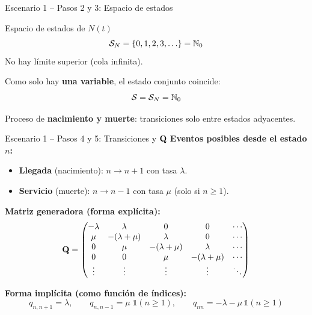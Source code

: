 \documentclass[aspectratio=1610, 9pt]{beamer}
\begin{document}
\begin{frame}{Escenario 1 -- Pasos 2 y 3: Espacio de estados}
\begin{block}{Espacio de estados de $N(t)$}
\[
\mathcal{S}_N = \{0, 1, 2, 3, \ldots\} = \mathbb{N}_0
\]
No hay l\'imite superior (cola infinita).
\end{block}

\vspace{4pt}
Como solo hay \textbf{una variable}, el estado conjunto coincide:
\[
\mathcal{S} = \mathcal{S}_N = \mathbb{N}_0
\]

\vspace{4pt}
\centering
{}

\vspace{4pt}
\small Proceso de \textbf{nacimiento y muerte}: transiciones solo entre estados adyacentes.
\end{frame}

\begin{frame}{Escenario 1 -- Pasos 4 y 5: Transiciones y $\mathbf{Q}$}
\textbf{Eventos posibles desde el estado $n$:}
\begin{itemize}
    \item \textbf{Llegada} (nacimiento): $n \to n+1$ con tasa $\lambda$.
    \item \textbf{Servicio} (muerte): $n \to n-1$ con tasa $\mu$ (solo si $n \ge 1$).
\end{itemize}

\vspace{4pt}
\textbf{Matriz generadora (forma expl\'icita):}
\[
\mathbf{Q} = \begin{pmatrix}
-\lambda & \lambda & 0 & 0 & \cdots \\
\mu & -(\lambda+\mu) & \lambda & 0 & \cdots \\
0 & \mu & -(\lambda+\mu) & \lambda & \cdots \\
0 & 0 & \mu & -(\lambda+\mu) & \cdots \\
\vdots & \vdots & \vdots & \vdots & \ddots
\end{pmatrix}
\]

\vspace{4pt}
\textbf{Forma impl\'icita (como funci\'on de \'indices):}
\[
q_{n,n+1} = \lambda, \qquad q_{n,n-1} = \mu \;\mathbb{1}(n\ge1), \qquad q_{nn} = -\lambda - \mu\,\mathbb{1}(n\ge1)
\]
\end{frame}
\end{document}
